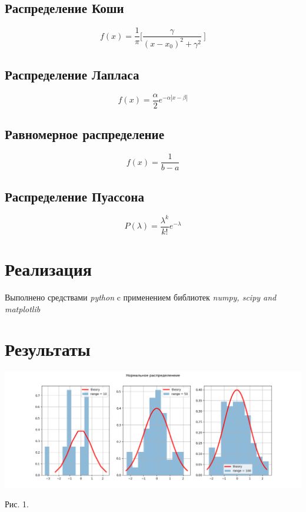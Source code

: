 \documentclass[12pt]{article}
\begin{document}
\subsection{Распределение Коши}

\begin{equation} \label{eq2}
f(x)= \frac{1}{\pi}\bigg[ \frac{\gamma}{(x - x_0)^2 + \gamma^2}\ \bigg]
\end{equation}

\subsection{Распределение Лапласа}

\begin{equation} \label{eq3}
f(x)= \frac{\alpha}{2}e^{-\alpha|x - \beta|}
\end{equation}

\subsection{Равномерное распределение}

\begin{equation} \label{eq4}
f(x)= \frac{1}{b - a}
\end{equation}

\subsection{Распределение Пуассона}

\begin{equation} \label{eq5}
P(\lambda) = \frac{\lambda^k}{k!}e^{-\lambda}
\end{equation}

\pagebreak

\section{Реализация}
Выполнено средствами \textit{python} c применением библиотек \textit{numpy, scipy and matplotlib}

\section{Результаты}

\includegraphics[width=\textwidth]{normal.png}
\begin{center}
Рис. 1. 
\end{center}
\end{document}
